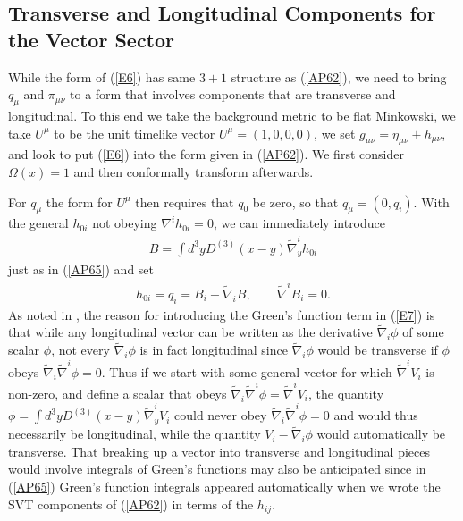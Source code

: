 \documentclass[aps]{revtex4}
\begin{document}
\subsection{Transverse and Longitudinal Components for the Vector Sector}

While the form of (\ref{E6}) has same $3+1$ structure as (\ref{AP62}), we need to bring $q_{\mu}$ and $\pi_{\mu\nu}$ to a form that involves components that are transverse and longitudinal.  To this end we take the background metric to be flat Minkowski,  we take $U^{\mu}$ to be the unit timelike vector $U^{\mu}=(1,0,0,0)$, we set $g_{\mu\nu}=\eta_{\mu\nu}+h_{\mu\nu}$, and look to put (\ref{E6}) into the form given in (\ref{AP62}). We first consider $\Omega(x)=1$ and then conformally transform afterwards.

For $q_{\mu}$ the form  for $U^{\mu}$ then requires that $q_0$ be zero, so that $q_{\mu}=(0,q_i)$. With the general $h_{0i}$ not obeying $\nabla^{i}h_{0i}=0$, we can immediately introduce 
%
\begin{eqnarray}
B=\int d^3yD^{(3)}(x-y)\tilde{\nabla}_y^ih_{0i}
\label{E7}
\end{eqnarray}
%
just as in (\ref{AP65}) and set
%
\begin{eqnarray}
h_{0i}=q_i=B_i+\tilde{\nabla}_iB,\qquad \tilde{\nabla}^iB_i=0.
\label{E8}
\end{eqnarray}
%
As noted in \cite{Mannheim2005}, the reason for introducing the Green's function term in (\ref{E7}) is that while any longitudinal vector can be written as the derivative $\tilde{\nabla}_i\phi$ of some scalar $\phi$, not every $\tilde{\nabla}_i\phi$ is in fact longitudinal since $\tilde{\nabla}_i\phi$ would be transverse if $\phi$ obeys $\tilde{\nabla}_i\tilde{\nabla}^i\phi=0$. Thus if we start with some general vector for which $\tilde{\nabla}^iV_i$ is non-zero, and define a scalar that obeys $\tilde{\nabla}_i\tilde{\nabla}^i\phi = \tilde{\nabla}^iV_i$, the quantity $\phi=\int d^3yD^{(3)}(x-y)\tilde{\nabla}_y^iV_i$ could never obey $\tilde{\nabla}_i\tilde{\nabla}^i\phi=0$ and would thus necessarily be longitudinal, while the quantity $V_i-\tilde{\nabla}_i\phi$ would automatically be transverse. That  breaking up a vector into transverse and longitudinal pieces would involve integrals of Green's functions may also be anticipated since in (\ref{AP65}) Green's function integrals appeared automatically when we wrote the SVT components of (\ref{AP62}) in terms of the $h_{ij}$. 
\end{document}
